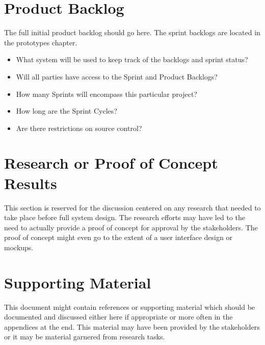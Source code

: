 \section{Product Backlog}
The full initial product backlog should go here.  The sprint backlogs are located in the prototypes chapter.

 
\begin{itemize}
\item What system will be used to keep track of the backlogs and sprint status?
\item Will all parties have access to the Sprint and Product Backlogs?
\item How many Sprints will encompass this particular project?
\item How long are the Sprint Cycles?
\item Are there restrictions on source control? 
\end{itemize}


\section{Research or Proof of Concept Results}
This section is reserved for the discussion centered on any research that needed 
to take place before full system design.  The research efforts may have led to 
the need to actually provide a proof of concept for approval by the stakeholders. 
 The proof of concept might even go to the extent of a user interface design or 
mockups. 


\section{Supporting Material}


This document might contain references or supporting material which should be documented 
and discussed  either here if appropriate or more often in the appendices at the end.  This material may have been provided by the stakeholders  
or it may be material garnered from research tasks.

